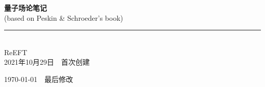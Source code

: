 \documentclass[10pt,b5paper,openany]{book} %
\newcommand{\HRule}{\rule{\linewidth}{0.5mm}}
\begin{document}
\begin{titlepage}
  \centering

  \mbox{}

  {\Huge \bfseries 量子场论笔记} \\[0.1cm]

  (based on Peskin \& Schroeder's book) \\[0.8cm]

  \HRule \\[0.9cm]

  {\Large ReEFT} \\[0.3cm]

  {\small 2021年10月29日\ \ 首次创建}

  {\small \today \ \ 最后修改} \\[0.3cm]

\end{titlepage}

\setcounter{page}{1}


\tableofcontents
{}
\clearpage
\end{document}
